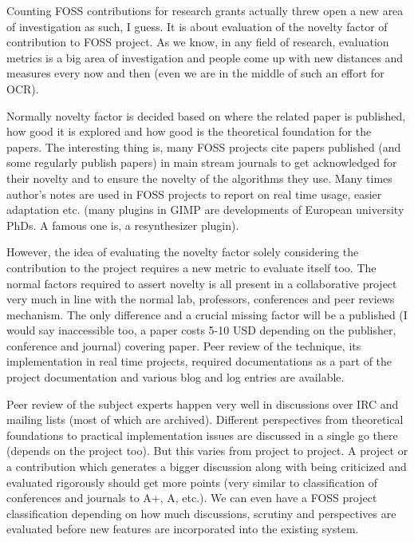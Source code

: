 \vskip 2pt

Counting FOSS contributions for research grants actually threw open
a new area of investigation as such, I guess. It is about evaluation of the novelty
factor of contribution to FOSS project. As we know, in any field of research,
evaluation metrics is a big area of investigation and people come up with new
distances and measures every now and then (even we are in the middle of
such an effort for OCR). 

Normally novelty factor is decided based on where
the related paper is published, how good it is explored and how good is the
theoretical foundation for the papers. The interesting thing is, many FOSS
projects cite papers published (and some regularly publish papers) in main
stream journals to get acknowledged for their novelty and to ensure the novelty of
the algorithms they use. Many times author's notes are used in FOSS projects to
report on real time usage, easier adaptation etc. (many plugins in GIMP are
developments of European university PhDs. A famous one is, a resynthesizer plugin).

However, the idea of evaluating the novelty factor solely considering the contribution
to the project requires a new metric to evaluate itself too. The normal factors
required to assert novelty is all present in a collaborative project very
much in line with the normal lab, professors, conferences and peer reviews mechanism.
The only difference and a crucial missing factor will be a published (I would
say inaccessible too, a paper costs 5-10 USD depending on the publisher,
conference and journal) covering paper. Peer review of the technique,
its implementation in real time projects, required documentations as a
part of the project documentation and various blog and log entries are
available.

Peer review of the subject experts happen very well in discussions
over IRC and mailing lists (most of which are archived). Different perspectives
from theoretical foundations to practical implementation issues are discussed
in a single go there (depends on the project too). But this varies from project
to project. A project or a contribution which generates a bigger discussion
along with being criticized and evaluated rigorously should get more points (very similar
to classification of conferences and journals to A+, A, etc.).  We can even
have a FOSS project classification depending on how much discussions, scrutiny
and perspectives are evaluated before new features are incorporated into the
existing system.

